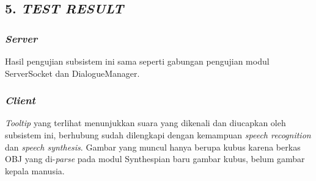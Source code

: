 \subsection*{\textcolor{subsectioncolor}{\textsf{5. \textit{TEST RESULT}}}}

\subsubsection*{\textit{Server}}
Hasil pengujian subsistem ini sama seperti gabungan pengujian modul ServerSocket dan DialogueManager.

\subsubsection*{\textit{Client}}
\textit{Tooltip} yang terlihat menunjukkan suara yang dikenali dan diucapkan oleh subsistem ini,
berhubung sudah dilengkapi dengan kemampuan \textit{speech recognition} dan \textit{speech synthesis}.
Gambar yang muncul hanya berupa kubus karena berkas OBJ yang di-\textit{parse} pada modul Synthespian baru gambar kubus,
belum gambar kepala manusia.
